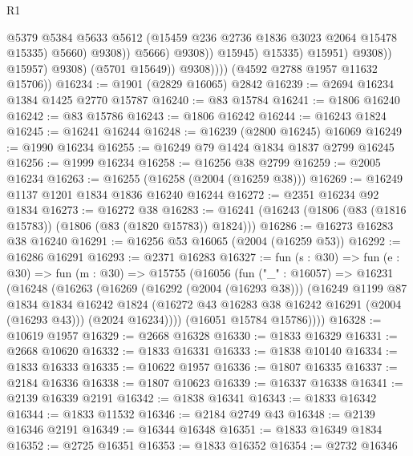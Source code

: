 \begin{lexlean}{R1}
\begin{coremodule}
                                          @5379
                                          @5384
                                          @5633
                                          @5612
                                          (@15459 @236 @2736 @1836 @3023 @2064 @15478 @15335)
                                          @5660)
                                        @9308))
                                    @5666)
                                  @9308))
                              @15945)
                            @15335)
                          @15951)
                        @9308))
                    @15957)
                  @9308)
                (@5701 @15649))
              @9308))))
      (@4592 @2788 @1957 @11632 @15706))
@16234 := @1901 (@2829 @16065) @2842
@16239 := @2694 @16234 @1384 @1425 @2770 @15787
@16240 := @83 @15784
@16241 := @1806 @16240
@16242 := @83 @15786
@16243 := @1806 @16242
@16244 := @16243 @1824
@16245 := @16241 @16244
@16248 := @16239 (@2800 @16245) @16069
@16249 := @1990 @16234
@16255 := @16249 @79 @1424 @1834 @1837 @2799 @16245
@16256 := @1999 @16234
@16258 := @16256 @38 @2799
@16259 := @2005 @16234
@16263 := @16255 (@16258 (@2004 (@16259 @38)))
@16269 := @16249 @1137 @1201 @1834 @1836 @16240 @16244
@16272 := @2351 @16234 @92 @1834
@16273 := @16272 @38
@16283 := @16241 (@16243 (@1806 (@83 (@1816 @15783)) (@1806 (@83 (@1820 @15783)) @1824)))
@16286 := @16273 @16283 @38 @16240
@16291 := @16256 @53 @16065 (@2004 (@16259 @53))
@16292 := @16286 @16291
@16293 := @2371 @16283
@16327 := fun (s : @30) =>
  fun (e : @30) =>
  fun (m : @30) =>
  @15755
    (@16056
      (fun ("_" : @16057) =>
      @16231
        (@16248
          (@16263
            (@16269
              (@16292 (@2004 (@16293 @38)))
              (@16249
                @1199
                @87
                @1834
                @1834
                @16242
                @1824
                (@16272 @43 @16283 @38 @16242 @16291 (@2004 (@16293 @43)))
                (@2024 @16234))))
          (@16051 @15784 @15786))))
@16328 := @10619 @1957
@16329 := @2668 @16328
@16330 := @1833 @16329
@16331 := @2668 @10620
@16332 := @1833 @16331
@16333 := @1838 @10140
@16334 := @1833 @16333
@16335 := @10622 @1957
@16336 := @1807 @16335
@16337 := @2184 @16336
@16338 := @1807 @10623
@16339 := @16337 @16338
@16341 := @2139 @16339 @2191
@16342 := @1838 @16341
@16343 := @1833 @16342
@16344 := @1833 @11532
@16346 := @2184 @2749 @43
@16348 := @2139 @16346 @2191
@16349 := @16344 @16348
@16351 := @1833 @16349 @1834
@16352 := @2725 @16351
@16353 := @1833 @16352
@16354 := @2732 @16346

\end{coremodule}
\end{lexlean}
